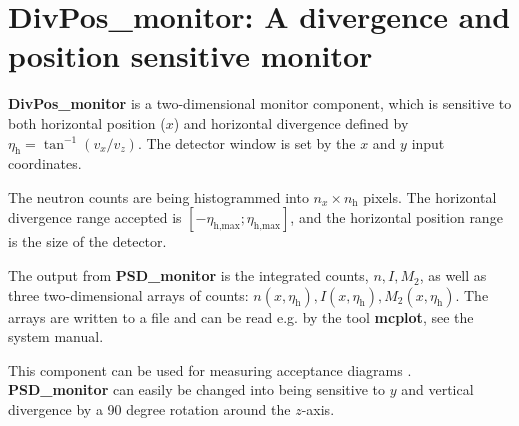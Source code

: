 \section{DivPos\_monitor: A divergence and position sensitive monitor}
\label{s:divpos-monitor}

\textbf{DivPos\_monitor} is a two-dimensional monitor component,
which is sensitive to both horizontal position ($x$) and horizontal divergence
defined by $\eta_\textrm{h} = \tan^{-1}(v_x/v_z)$.
The detector window is set
by the $x$ and $y$ input coordinates.

The neutron counts are being histogrammed
into $n_x \times n_\textrm{h}$ pixels. The horizontal divergence range accepted is
$[-\eta_\textrm{h,max}; \eta_\textrm{h,max}]$, and the horizontal position
range is the size of the detector.

The output from \textbf{PSD\_monitor} is the integrated counts, $n, I, M_2$,
as well as
three two-dimensional arrays of counts: $n(x,\eta_\textrm{h}),
I(x,\eta_\textrm{h}), M_2(x,\eta_\textrm{h})$.
The arrays are written to a file and can be read e.g. by the tool
\textbf{mcplot}, see the system manual.

This component can be used for measuring acceptance diagrams \cite{Cussen03}.
\textbf{PSD\_monitor} can easily be changed into being sensitive
to $y$ and vertical divergence by a 90 degree rotation around the $z$-axis.
